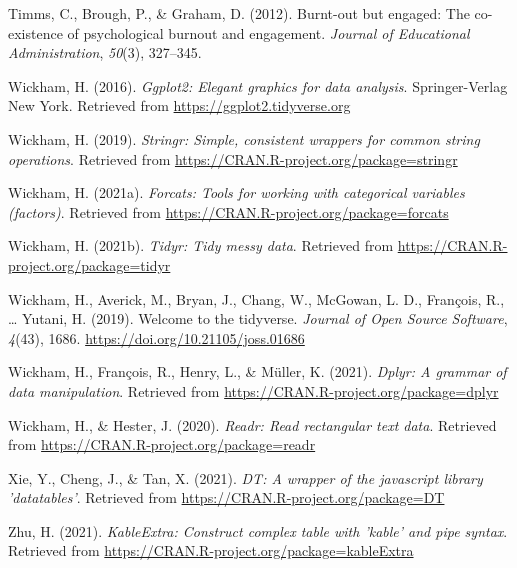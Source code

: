 \documentclass[
  english,
  man]{apa6}
\begin{document}
\leavevmode\hypertarget{ref-timms2012burnt}{}%
Timms, C., Brough, P., \& Graham, D. (2012). Burnt-out but engaged: The co-existence of psychological burnout and engagement. \emph{Journal of Educational Administration}, \emph{50}(3), 327--345.

\leavevmode\hypertarget{ref-R-ggplot2}{}%
Wickham, H. (2016). \emph{Ggplot2: Elegant graphics for data analysis}. Springer-Verlag New York. Retrieved from \url{https://ggplot2.tidyverse.org}

\leavevmode\hypertarget{ref-R-stringr}{}%
Wickham, H. (2019). \emph{Stringr: Simple, consistent wrappers for common string operations}. Retrieved from \url{https://CRAN.R-project.org/package=stringr}

\leavevmode\hypertarget{ref-R-forcats}{}%
Wickham, H. (2021a). \emph{Forcats: Tools for working with categorical variables (factors)}. Retrieved from \url{https://CRAN.R-project.org/package=forcats}

\leavevmode\hypertarget{ref-R-tidyr}{}%
Wickham, H. (2021b). \emph{Tidyr: Tidy messy data}. Retrieved from \url{https://CRAN.R-project.org/package=tidyr}

\leavevmode\hypertarget{ref-R-tidyverse}{}%
Wickham, H., Averick, M., Bryan, J., Chang, W., McGowan, L. D., François, R., \ldots{} Yutani, H. (2019). Welcome to the tidyverse. \emph{Journal of Open Source Software}, \emph{4}(43), 1686. \url{https://doi.org/10.21105/joss.01686}

\leavevmode\hypertarget{ref-R-dplyr}{}%
Wickham, H., François, R., Henry, L., \& Müller, K. (2021). \emph{Dplyr: A grammar of data manipulation}. Retrieved from \url{https://CRAN.R-project.org/package=dplyr}

\leavevmode\hypertarget{ref-R-readr}{}%
Wickham, H., \& Hester, J. (2020). \emph{Readr: Read rectangular text data}. Retrieved from \url{https://CRAN.R-project.org/package=readr}

\leavevmode\hypertarget{ref-R-DT}{}%
Xie, Y., Cheng, J., \& Tan, X. (2021). \emph{DT: A wrapper of the javascript library 'datatables'}. Retrieved from \url{https://CRAN.R-project.org/package=DT}

\leavevmode\hypertarget{ref-R-kableExtra}{}%
Zhu, H. (2021). \emph{KableExtra: Construct complex table with 'kable' and pipe syntax}. Retrieved from \url{https://CRAN.R-project.org/package=kableExtra}

\endgroup
\end{document}
